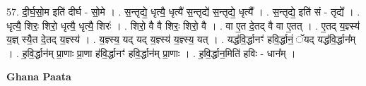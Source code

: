 \documentclass[17pt]{extarticle}
\begin{document}
57. दी॒र्घ॒सो॒म इति॑ दीर्घ - सो॒मे । . स॒न्तृद्ये॒ धृत्यै॒ धृत्यै॑ स॒न्तृद्ये॑ स॒न्तृद्ये॒ धृत्यै᳚ । . स॒न्तृद्ये॒ इति॑ सं - तृद्ये᳚ । . धृत्यै॒ शिरः॒ शिरो॒ धृत्यै॒ धृत्यै॒ शिरः॑ । . शिरो॒ वै वै शिरः॒ शिरो॒ वै । . वा ए॒त दे॒तद् वै वा ए॒तत् । . ए॒तद् य॒ज्ञ्स्य॑ य॒ज्ञ् स्यै॒त दे॒तद् य॒ज्ञ्स्य॑ । . य॒ज्ञ्स्य॒ यद् यद् य॒ज्ञ्स्य॑ य॒ज्ञ्स्य॒ यत् । . यद्ध॑वि॒र्द्धानꣳ॑ हवि॒र्द्धानं॒ ॅयद् यद्ध॑वि॒र्द्धान᳚म् । . ह॒वि॒र्द्धान॑म् प्रा॒णाः प्रा॒णा ह॑वि॒र्द्धानꣳ॑ हवि॒र्द्धान॑म् प्रा॒णाः । . ह॒वि॒र्द्धान॒मिति॑ हविः - धान᳚म् । \newline

\textbf{Ghana Paata } \newline
\end{document}
